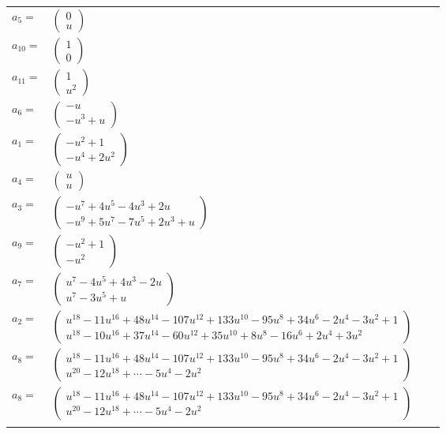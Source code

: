 \documentclass[1p]{elsarticle_modified}
\theoremstyle{definition}
\begin{document}
\begin{tabular}{m{7pt} m{180pt} m{7pt} m{180pt} }
\flushright $a_{5}=$&$\begin{pmatrix}0\\u\end{pmatrix}$ \\
\flushright $a_{10}=$&$\begin{pmatrix}1\\0\end{pmatrix}$ \\
\flushright $a_{11}=$&$\begin{pmatrix}1\\u^2\end{pmatrix}$ \\
\flushright $a_{6}=$&$\begin{pmatrix}- u\\- u^3+u\end{pmatrix}$ \\
\flushright $a_{1}=$&$\begin{pmatrix}- u^2+1\\- u^4+2 u^2\end{pmatrix}$ \\
\flushright $a_{4}=$&$\begin{pmatrix}u\\u\end{pmatrix}$ \\
\flushright $a_{3}=$&$\begin{pmatrix}- u^7+4 u^5-4 u^3+2 u\\- u^9+5 u^7-7 u^5+2 u^3+u\end{pmatrix}$ \\
\flushright $a_{9}=$&$\begin{pmatrix}- u^2+1\\- u^2\end{pmatrix}$ \\
\flushright $a_{7}=$&$\begin{pmatrix}u^7-4 u^5+4 u^3-2 u\\u^7-3 u^5+u\end{pmatrix}$ \\
\flushright $a_{2}=$&$\begin{pmatrix}u^{18}-11 u^{16}+48 u^{14}-107 u^{12}+133 u^{10}-95 u^8+34 u^6-2 u^4-3 u^2+1\\u^{18}-10 u^{16}+37 u^{14}-60 u^{12}+35 u^{10}+8 u^8-16 u^6+2 u^4+3 u^2\end{pmatrix}$ \\
\flushright $a_{8}=$&$\begin{pmatrix}u^{18}-11 u^{16}+48 u^{14}-107 u^{12}+133 u^{10}-95 u^8+34 u^6-2 u^4-3 u^2+1\\u^{20}-12 u^{18}+\cdots-5 u^4-2 u^2\end{pmatrix}$\\ \flushright $a_{8}=$&$\begin{pmatrix}u^{18}-11 u^{16}+48 u^{14}-107 u^{12}+133 u^{10}-95 u^8+34 u^6-2 u^4-3 u^2+1\\u^{20}-12 u^{18}+\cdots-5 u^4-2 u^2\end{pmatrix}$\\&\end{tabular}
\end{document}
